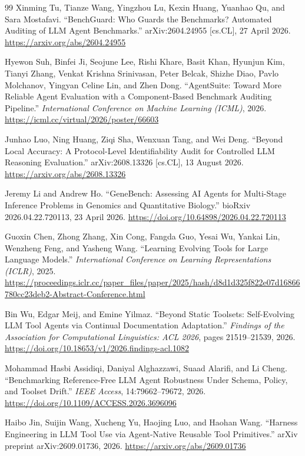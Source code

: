 \documentclass[11pt]{article}
\begin{document}
\begin{thebibliography}{99}
Xinming Tu, Tianze Wang, Yingzhou Lu, Kexin Huang, Yuanhao Qu, and
Sara Mostafavi.
``BenchGuard: Who Guards the Benchmarks? Automated Auditing of LLM Agent
Benchmarks.''
arXiv:2604.24955 [cs.CL], 27 April 2026.
\url{https://arxiv.org/abs/2604.24955}

Hyewon Suh, Binfei Ji, Seojune Lee, Rishi Khare, Basit Khan, Hyunjun Kim,
Tianyi Zhang, Venkat Krishna Srinivasan, Peter Belcak, Shizhe Diao,
Pavlo Molchanov, Yingyan Celine Lin, and Zhen Dong.
``AgentSuite: Toward More Reliable Agent Evaluation with a Component-Based
Benchmark Auditing Pipeline.''
\emph{International Conference on Machine Learning (ICML)}, 2026.
\url{https://icml.cc/virtual/2026/poster/66603}

Junhao Luo, Ning Huang, Ziqi Sha, Wenxuan Tang, and Wei Deng.
``Beyond Local Accuracy: A Protocol-Level Identifiability Audit for Controlled
LLM Reasoning Evaluation.''
arXiv:2608.13326 [cs.CL], 13 August 2026.
\url{https://arxiv.org/abs/2608.13326}

Jeremy Li and Andrew Ho.
``GeneBench: Assessing AI Agents for Multi-Stage Inference Problems in Genomics
and Quantitative Biology.''
bioRxiv 2026.04.22.720113, 23 April 2026.
\url{https://doi.org/10.64898/2026.04.22.720113}

Guoxin Chen, Zhong Zhang, Xin Cong, Fangda Guo, Yesai Wu, Yankai Lin,
Wenzheng Feng, and Yasheng Wang.
``Learning Evolving Tools for Large Language Models.''
\emph{International Conference on Learning Representations (ICLR)}, 2025.
\url{https://proceedings.iclr.cc/paper_files/paper/2025/hash/d8d1d325f822e07d16866780cc23deb2-Abstract-Conference.html}

Bin Wu, Edgar Meij, and Emine Yilmaz.
``Beyond Static Toolsets: Self-Evolving LLM Tool Agents via Continual
Documentation Adaptation.''
\emph{Findings of the Association for Computational Linguistics: ACL 2026},
pages 21519--21539, 2026.
\url{https://doi.org/10.18653/v1/2026.findings-acl.1082}

Mohammad Hasbi Assidiqi, Daniyal Alghazzawi, Suaad Alarifi, and Li Cheng.
``Benchmarking Reference-Free LLM Agent Robustness Under Schema, Policy, and
Toolset Drift.''
\emph{IEEE Access}, 14:79662--79672, 2026.
\url{https://doi.org/10.1109/ACCESS.2026.3696096}

Haibo Jin, Suijin Wang, Xucheng Yu, Haojing Luo, and Haohan Wang.
``Harness Engineering in LLM Tool Use via Agent-Native Reusable Tool
Primitives.''
arXiv preprint arXiv:2609.01736, 2026.
\url{https://arxiv.org/abs/2609.01736}


\end{thebibliography}
\end{document}
